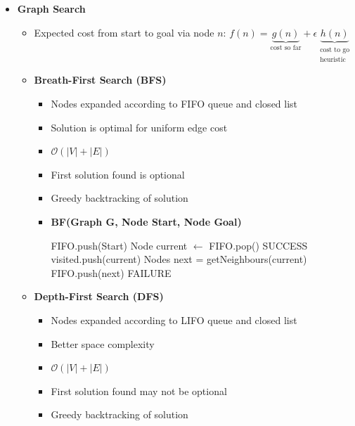 \documentclass[a4paper]{article}
\newcommand{\ipro}{\item[+]}
\newcommand{\icon}{\item[-]}
\newcommand{\ides}[1]{\item \textbf{#1}}
\newcommand{\bigO}{\mathcal{O}}
\begin{document}
\begin{itemize}
\begin{itemize}
\begin{itemize}
                \end{itemize}
        \end{itemize}
    \item[2)] \textbf{Graph Search}
        \begin{itemize}
            \item Expected cost from start to goal via node $n$: $f(n) = \underbrace{g(n)}_{\text{cost so far}} + \epsilon \underbrace{h(n)}_{\substack{\text{cost to go} \\ \text{heuristic}}}$
            \ides{Breath-First Search (BFS)}
                \begin{itemize}
                    \item Nodes expanded according to FIFO queue and closed list
                    \item Solution is optimal for uniform edge cost
                    \item $\bigO(|V| + |E|)$
                    \ipro First solution found is optional
                    \item Greedy backtracking of solution
                    \ides{BF(Graph G, Node Start, Node Goal)}
                        \begin{algorithmic}
                            \STATE FIFO.push(Start)
                                \STATE Node current $\leftarrow$ FIFO.pop()
                                    \RETURN SUCCESS
                                \ENDIF
                                \STATE visited.push(current)
                                \STATE Nodes next = getNeighbours(current)
                                    \STATE FIFO.push(next)
                                \ENDFOR
                            \ENDWHILE
                            \RETURN FAILURE
                        \end{algorithmic}
                \end{itemize}
            \ides{Depth-First Search (DFS)}
                \begin{itemize}
                    \item Nodes expanded according to LIFO queue and closed list
                    \ipro Better space complexity
                    \item $\bigO(|V| + |E|)$
                    \icon First solution found may not be optional
                    \item Greedy backtracking of solution

\end{itemize}
\end{itemize}
\end{itemize}
\end{document}
